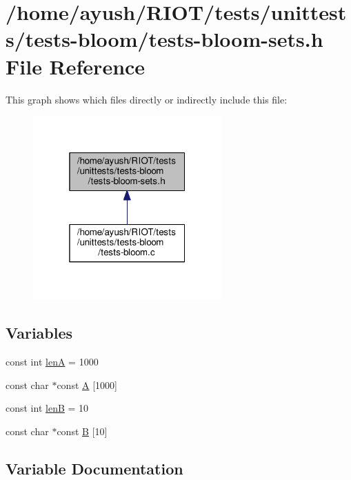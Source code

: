 \hypertarget{tests-bloom-sets_8h}{}\section{/home/ayush/\+R\+I\+O\+T/tests/unittests/tests-\/bloom/tests-\/bloom-\/sets.h File Reference}
\label{tests-bloom-sets_8h}
This graph shows which files directly or indirectly include this file\+:
\nopagebreak
\begin{figure}[H]
\begin{center}
\leavevmode
\includegraphics[width=205pt]{tests-bloom-sets_8h__dep__incl}
\end{center}
\end{figure}
\subsection*{Variables}
\begin{DoxyCompactItemize}
\item 
const int \hyperlink{tests-bloom-sets_8h_a9d1d21784df288cdc401892549fd7bb9}{lenA} = 1000
\item 
const char $\ast$const \hyperlink{tests-bloom-sets_8h_a60cc425f0e102ba2f40cd5b7714445cf}{A} \mbox{[}1000\mbox{]}
\item 
const int \hyperlink{tests-bloom-sets_8h_a3b106264c2b9acbabae5c70249d93614}{lenB} = 10
\item 
const char $\ast$const \hyperlink{tests-bloom-sets_8h_aa1d3c5d0f3494870dbcab1da034256b9}{B} \mbox{[}10\mbox{]}
\end{DoxyCompactItemize}


\subsection{Variable Documentation}
\mbox{\label{tests-bloom-sets_8h_a60cc425f0e102ba2f40cd5b7714445cf}} 
